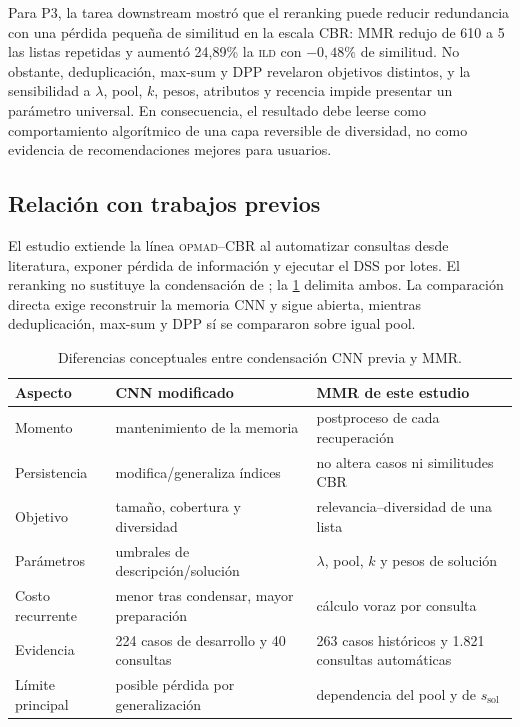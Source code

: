 \documentclass[11pt,a4paper]{article}
\newcommand{\OPMAD}{\textsc{opmad}}
\newcommand{\ILD}{\textsc{ild}}
\begin{document}
Para P3, la tarea downstream mostró que el reranking puede reducir redundancia con una pérdida pequeña de similitud en la escala CBR: MMR redujo de 610 a 5 las listas repetidas y aumentó 24,89\% la \ILD{} con $-0,48\%$ de similitud. No obstante, deduplicación, max-sum y DPP revelaron objetivos distintos, y la sensibilidad a $\lambda$, pool, $k$, pesos, atributos y recencia impide presentar un parámetro universal. En consecuencia, el resultado debe leerse como comportamiento algorítmico de una capa reversible de diversidad, no como evidencia de recomendaciones mejores para usuarios.

\subsection{Relación con trabajos previos}

El estudio extiende la línea \OPMAD{}--CBR \citep{MonteroJimenez2021OPMADCBR,MunozHernandez2021OntologyCBR} al automatizar consultas desde literatura, exponer pérdida de información y ejecutar el DSS por lotes. El reranking no sustituye la condensación de \citet{MunozPena2025Diversity}; la \cref{tab:cnn-mmr} delimita ambos. La comparación directa exige reconstruir la memoria CNN y sigue abierta, mientras deduplicación, max-sum y DPP sí se compararon sobre igual pool.

\begin{table}[H]
\centering
\caption{Diferencias conceptuales entre condensación CNN previa y MMR.}
\label{tab:cnn-mmr}
\small
\begin{tabularx}{\linewidth}{lXX}
\toprule
Aspecto & CNN modificado \citep{MunozPena2025Diversity} & MMR de este estudio \\
\midrule
Momento & mantenimiento de la memoria & postproceso de cada recuperación \\
Persistencia & modifica/generaliza índices & no altera casos ni similitudes CBR \\
Objetivo & tamaño, cobertura y diversidad & relevancia--diversidad de una lista \\
Parámetros & umbrales de descripción/solución & $\lambda$, pool, $k$ y pesos de solución \\
Costo recurrente & menor tras condensar, mayor preparación & cálculo voraz por consulta \\
Evidencia & 224 casos de desarrollo y 40 consultas & 263 casos históricos y 1.821 consultas automáticas \\
Límite principal & posible pérdida por generalización & dependencia del pool y de $s_{\mathrm{sol}}$ \\
\bottomrule
\end{tabularx}
\end{table}
\end{document}

